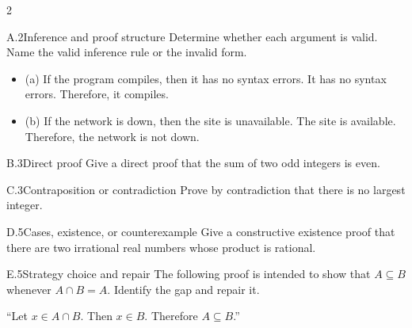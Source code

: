 \documentclass[9pt]{extarticle}
\begin{document}
\begin{multicols}{2}
\begin{CoreProblem}{A.2}{Inference and proof structure}
Determine whether each argument is valid. Name the valid inference rule or the invalid form.
\begin{itemize}
  \item (a) If the program compiles, then it has no syntax errors. It has no syntax errors. Therefore, it compiles.
  \item (b) If the network is down, then the site is unavailable. The site is
        available. Therefore, the network is not down.
\end{itemize}
\end{CoreProblem}
\begin{CoreProblem}{B.3}{Direct proof}
Give a direct proof that the sum of two odd integers is even.
\end{CoreProblem}
\begin{CoreProblem}{C.3}{Contraposition or contradiction}
Prove by contradiction that there is no largest integer.
\end{CoreProblem}
\columnbreak
\begin{CoreProblem}{D.5}{Cases, existence, or counterexample}
Give a constructive existence proof that there are two irrational real numbers
whose product is rational.
\end{CoreProblem}
\begin{CoreProblem}{E.5}{Strategy choice and repair}
The following proof is intended to show that $A\subseteq B$ whenever
$A\cap B=A$. Identify the gap and repair it.

``Let $x\in A\cap B$. Then $x\in B$. Therefore $A\subseteq B$.''
\end{CoreProblem}
\end{multicols}
\CoreWorkArea
\FormBreak
{}
\end{document}
